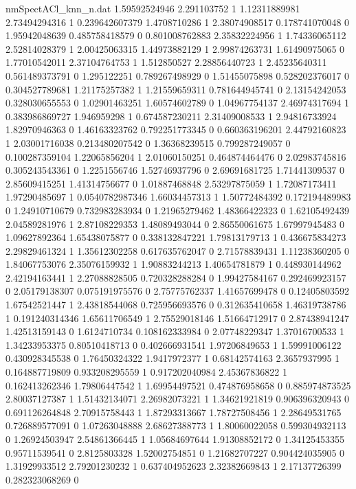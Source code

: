 \begin{filecontents}{nmSpectACl_knn_n.dat}
1.59592524946 2.291103752 1
1.12311889981 2.73494294316 1
0.239642607379 1.4708710286 1
2.38074908517 0.178741070048 0
1.95942048639 0.485758418579 0
0.801008762883 2.35832224956 1
1.74336065112 2.52814028379 1
2.00425063315 1.44973882129 1
2.99874263731 1.61490975065 0
1.77010542011 2.37104764753 1
1.512850527 2.28856440723 1
2.45235640311 0.561489373791 0
1.295122251 0.789267498929 0
1.51455075898 0.528202376017 0
0.304527789681 1.21175257382 1
1.21559659311 0.781644945741 0
2.13154242053 0.328030655553 0
1.02901463251 1.60574602789 0
1.04967754137 2.46974317694 1
0.383986869727 1.946959298 1
0.674587230211 2.31409008533 1
2.94816733924 1.82970946363 0
1.46163323762 0.792251773345 0
0.660363196201 2.44792160823 1
2.03001716038 0.213480207542 0
1.36368239515 0.799287249057 0
0.100287359104 1.22065856204 1
2.01060150251 0.464874464476 0
2.02983745816 0.305243543361 0
1.2251556746 1.52746937796 0
2.69691681725 1.71441309537 0
2.85609415251 1.41314756677 0
1.01887468848 2.53297875059 1
1.72087173411 1.97290485697 1
0.0540782987346 1.66034457313 1
1.50772484392 0.172194489983 0
1.24910710679 0.732983283934 0
1.21965279462 1.48366422323 0
1.62105492439 2.04589281976 1
2.87108229353 1.48089493044 0
2.86550061675 1.67997945483 0
1.09627892364 1.65438075877 0
0.338132847221 1.79813179713 1
0.436675834273 2.29829461324 1
1.35612302258 0.617635762047 0
2.71578839431 1.11238360205 0
1.84067753076 2.35076159932 1
1.90883244213 1.40654781879 1
0.448930144962 2.42194163441 1
2.27088828505 0.720328288284 0
1.99427584167 0.292469923157 0
2.05179138307 0.075191975576 0
2.75775762337 1.41657699478 0
0.12405803592 1.67542521447 1
2.43818544068 0.725956693576 0
0.312635410658 1.46319738786 1
0.191240314346 1.65611706549 1
2.75529018146 1.51664712917 0
2.87438941247 1.42513159143 0
1.6124710734 0.108162333984 0
2.07748229347 1.37016700533 1
1.34233953375 0.80510418713 0
0.402666931541 1.97206849653 1
1.59991006122 0.430928345538 0
1.76450324322 1.9417972377 1
0.68142574163 2.3657937995 1
0.164887719809 0.933208295559 1
0.917202040984 2.45367836822 1
0.162413262346 1.79806447542 1
1.69954497521 0.474876958658 0
0.885974873525 2.80037127387 1
1.51432134071 2.26982073221 1
1.34621921819 0.906396320943 0
0.691126264848 2.70915758443 1
1.87293313667 1.78727508456 1
2.28649531765 0.726889577091 0
1.07263048888 2.68627388773 1
1.80060022058 0.599304932113 0
1.26924503947 2.54861366445 1
1.05684697644 1.91308852172 0
1.34125453355 0.95711539541 0
2.8125803328 1.52002754851 0
1.21682707227 0.904424035905 0
1.31929933512 2.79201230232 1
0.637404952623 2.32382669843 1
2.17137726399 0.282323068269 0

\end{filecontents}
